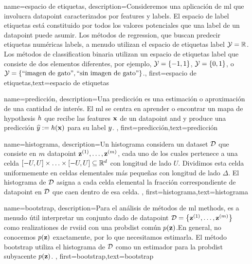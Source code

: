 {name={espacio de etiquetas},
	description={Consideremos una aplicación de \gls{ml} que involucra \gls{datapoint} caracterizados por \gls{feature}s 
		y \gls{label}s. El espacio de \gls{label} etiquetas está constituido por todos los valores potenciales que una \gls{label} 
		de un \gls{datapoint} puede asumir. Los métodos de \Gls{regression}, que  buscan predecir etiquetas numéricas \gls{label}s, 
		a menudo utilizan el espacio de etiquetas \gls{label} $\mathcal{Y} = \mathbb{R}$. Los métodos de \gls{classification} binaria utilizan un espacio de etiquetas \gls{label}  
		que consiste de dos elementos diferentes, por ejemplo, $\mathcal{Y} =\{-1,1\}$, $\mathcal{Y}=\{0,1\}$, 
		o $\mathcal{Y} = \{ \mbox{``imagen de gato''}, \mbox{``sin imagen de gato''} \}$.}, first={espacio de etiquetas},text={espacio de etiquetas}  
}

{name={predicción},
	description={Una  predicción es una estimación o aproximación de una cantidad de interés.  
		El \Gls{ml} se centra en aprender o encontrar un mapa de \gls{hypothesis} $h$ 
		que recibe las \gls{feature}s ${\bf x}$ de un \gls{datapoint} and y produce una predicción
		$\widehat{y} := h({\bf x})$ para su \gls{label} $y$. },
	first={predicción},text={predicción}  
}

{name={histograma},
	description={Un histograma  considera un \gls{dataset} $\mathcal{D}$ que consiste en $m$ \gls{datapoint}
		${\bf z}^{(1)},\ldots,{\bf z}^{(m)}$, cada uno de los cuales pertenece a una celda  
		$[-U,U] \times \ldots \times [-U,U] \subseteq \mathbb{R}^{d}$ con longitud de lado 
		$U$. Dividimos esta celda uniformemente en celdas elementales más pequeñas con longitud de lado 
		$\Delta$. El histograma de $\mathcal{D}$ asigna a cada celda elemental la fracción correspondiente de
		\gls{datapoint} en $\mathcal{D}$ que caen dentro de esa celda.
	},
	first={histograma},text={histograma}  
}

{name={bootstrap},
	description={Para el análisis de métodos de \gls{ml} methods, es a menudo útil interpretar 
		un conjunto dado de \gls{datapoint} $\mathcal{D} = \big\{ {\bf z}^{(1)},\ldots,{\bf z}^{(m)}\big\}$ 
		como \gls{realization}es de \gls{rv}s\gls{iid} con una \gls{probdist} común $p({\bf z})$.En general, no conocemos 
		$p({\bf z})$ exactamente, por lo que necesitamos estimarla. El método bootstrap utiliza el histograma de 
		$\mathcal{D}$ como un estimador para la \gls{probdist} subyacente $p({\bf z})$. 
	},
	first={bootstrap},text={bootstrap}  
}

